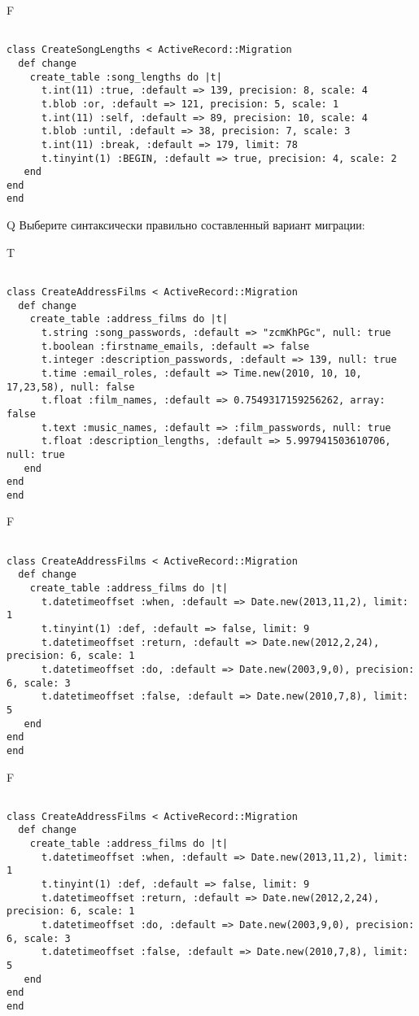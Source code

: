 F
\begin{verbatim}
		
class CreateSongLengths < ActiveRecord::Migration 
  def change 
    create_table :song_lengths do |t| 
      t.int(11) :true, :default => 139, precision: 8, scale: 4
      t.blob :or, :default => 121, precision: 5, scale: 1
      t.int(11) :self, :default => 89, precision: 10, scale: 4
      t.blob :until, :default => 38, precision: 7, scale: 3
      t.int(11) :break, :default => 179, limit: 78
      t.tinyint(1) :BEGIN, :default => true, precision: 4, scale: 2
   end
end
end
\end{verbatim}

Q
Выберите синтаксически правильно составленный вариант миграции:

T
\begin{verbatim}
		
class CreateAddressFilms < ActiveRecord::Migration 
  def change 
    create_table :address_films do |t| 
      t.string :song_passwords, :default => "zcmKhPGc", null: true
      t.boolean :firstname_emails, :default => false
      t.integer :description_passwords, :default => 139, null: true
      t.time :email_roles, :default => Time.new(2010, 10, 10, 17,23,58), null: false
      t.float :film_names, :default => 0.7549317159256262, array: false
      t.text :music_names, :default => :film_passwords, null: true
      t.float :description_lengths, :default => 5.997941503610706, null: true
   end
end
end
\end{verbatim}

F
\begin{verbatim}
		
class CreateAddressFilms < ActiveRecord::Migration 
  def change 
    create_table :address_films do |t| 
      t.datetimeoffset :when, :default => Date.new(2013,11,2), limit: 1
      t.tinyint(1) :def, :default => false, limit: 9
      t.datetimeoffset :return, :default => Date.new(2012,2,24), precision: 6, scale: 1
      t.datetimeoffset :do, :default => Date.new(2003,9,0), precision: 6, scale: 3
      t.datetimeoffset :false, :default => Date.new(2010,7,8), limit: 5
   end
end
end
\end{verbatim}

F
\begin{verbatim}
		
class CreateAddressFilms < ActiveRecord::Migration 
  def change 
    create_table :address_films do |t| 
      t.datetimeoffset :when, :default => Date.new(2013,11,2), limit: 1
      t.tinyint(1) :def, :default => false, limit: 9
      t.datetimeoffset :return, :default => Date.new(2012,2,24), precision: 6, scale: 1
      t.datetimeoffset :do, :default => Date.new(2003,9,0), precision: 6, scale: 3
      t.datetimeoffset :false, :default => Date.new(2010,7,8), limit: 5
   end
end
end
\end{verbatim}

